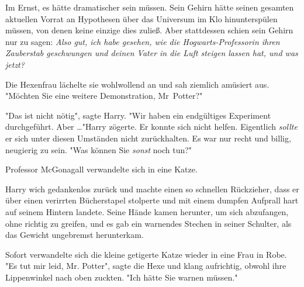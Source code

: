 Im Ernst, es hätte dramatischer sein müssen. Sein Gehirn hätte seinen gesamten aktuellen Vorrat an Hypothesen über das Universum im Klo hinunterspülen müssen, von denen keine einzige dies zuließ. Aber stattdessen schien sein Gehirn nur zu sagen: \emph{Also gut, ich habe gesehen, wie die Hogwarts-Professorin ihren Zauberstab geschwungen und deinen Vater in die Luft steigen lassen hat, und was jetzt?}

Die Hexenfrau lächelte sie wohlwollend an und sah ziemlich amüsiert aus. "Möchten Sie eine weitere Demonstration, Mr~Potter?"

"Das ist nicht nötig", sagte Harry. "Wir haben ein endgültiges Experiment durchgeführt. Aber …"Harry zögerte. Er konnte sich nicht helfen. Eigentlich \emph{sollte} er sich unter diesen Umständen nicht zurückhalten. Es war nur recht und billig, neugierig zu sein.  "Was können Sie \emph{sonst} noch tun?"

Professor McGonagall verwandelte sich in eine Katze.

Harry wich gedankenlos zurück und machte einen so schnellen Rückzieher, dass er über einen verirrten Bücherstapel stolperte und mit einem dumpfen Aufprall hart auf seinem Hintern landete. Seine Hände kamen herunter, um sich abzufangen, ohne richtig zu greifen, und es gab ein warnendes Stechen in seiner Schulter, als das Gewicht ungebremst herunterkam.

Sofort verwandelte sich die kleine getigerte Katze wieder in eine Frau in Robe. "Es tut mir leid, Mr. Potter", sagte die Hexe und klang aufrichtig, obwohl ihre Lippenwinkel nach oben zuckten. "Ich hätte Sie warnen müssen."

